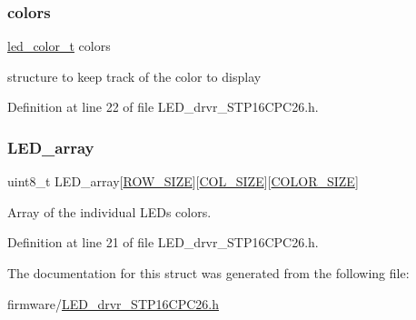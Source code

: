 \hypertarget{struct_l_e_d__drvr__t_a544f37552e92b00030921908e34edda4}{}\label{struct_l_e_d__drvr__t_a544f37552e92b00030921908e34edda4} 
\subsubsection{\texorpdfstring{colors}{colors}}
{\footnotesize\ttfamily \hyperlink{structled__color__t}{led\+\_\+color\+\_\+t} colors}



structure to keep track of the color to display 



Definition at line 22 of file L\+E\+D\+\_\+drvr\+\_\+\+S\+T\+P16\+C\+P\+C26.\+h.

\hypertarget{struct_l_e_d__drvr__t_a7f01ed87a74212d270cae32130977184}{}\label{struct_l_e_d__drvr__t_a7f01ed87a74212d270cae32130977184} 
\subsubsection{\texorpdfstring{L\+E\+D\+\_\+array}{LED\_array}}
{\footnotesize\ttfamily uint8\+\_\+t L\+E\+D\+\_\+array\mbox{[}\hyperlink{_l_e_d__drvr___s_t_p16_c_p_c26_8h_aa4d030604a90c8d019d90fc721900d63}{R\+O\+W\+\_\+\+S\+I\+ZE}\mbox{]}\mbox{[}\hyperlink{_l_e_d__drvr___s_t_p16_c_p_c26_8h_a99468544016f0abb855e6415c629ec29}{C\+O\+L\+\_\+\+S\+I\+ZE}\mbox{]}\mbox{[}\hyperlink{_l_e_d__drvr___s_t_p16_c_p_c26_8h_a68a80be4e42506b0127b8559bc6662b0}{C\+O\+L\+O\+R\+\_\+\+S\+I\+ZE}\mbox{]}}



Array of the individual L\+E\+Ds colors. 



Definition at line 21 of file L\+E\+D\+\_\+drvr\+\_\+\+S\+T\+P16\+C\+P\+C26.\+h.



The documentation for this struct was generated from the following file\+:\begin{DoxyCompactItemize}
\item 
firmware/\hyperlink{_l_e_d__drvr___s_t_p16_c_p_c26_8h}{L\+E\+D\+\_\+drvr\+\_\+\+S\+T\+P16\+C\+P\+C26.\+h}\end{DoxyCompactItemize}
